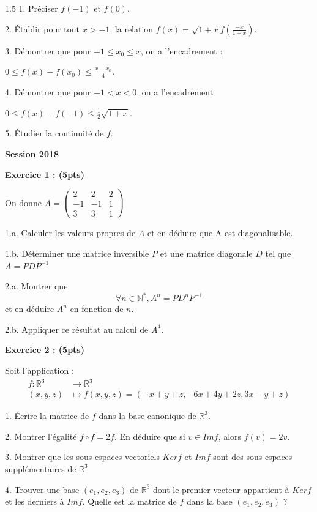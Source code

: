 \documentclass[12pt]{article}
\begin{document}
\begin{spacing}{1.5}
1. Préciser $f(-1)$ et $f(0)$.

2. Établir pour tout $x>-1$, la relation $f(x)=\sqrt{1+x}f(\frac{-x}{1+x})$.

3. Démontrer que pour $-1\leq x_0\leq x$, on a l'encadrement :

$0\leq f(x)-f(x_0)\leq \frac{x-x_0}{4}$.

4. Démontrer que pour $-1<x<0$, on a l'encadrement 

$0\leq f(x)-f(-1)\leq \frac{1}{2}\sqrt{1+x}$.

5. Étudier la continuité de $f$.



\medskip

\textbf{Session 2018}

\textbf{Exercice 1 : (5pts)}

On donne $A=\begin{pmatrix}
2 & 2& 2 \\ 
-1 & -1 & 1 \\ 
3 & 3 & 1
\end{pmatrix} $

1.a. Calculer les valeurs propres de $A$ et en déduire que A est diagonalisable.

1.b. Déterminer une matrice inversible $P$ et une matrice diagonale $D$ tel que $A=PDP^{-1}$

2.a. Montrer que 
\[
\forall {n\in\mathbb{N}^*}, A^n = PD^nP^{-1}
\]
et en déduire $A^n$ en fonction de $n$.

2.b. Appliquer ce résultat au  calcul de $A^4$.

\textbf{Exercice 2 : (5pts)}

Soit l'application : 
\begin{align*}
f:\mathbb{R}^3 &\longrightarrow \mathbb{R}^3\\
(x,y,z) &\longmapsto f(x,y,z)=(-x+y+z, -6x+4y+2z, 3x-y+z)
\end{align*} 

1. Écrire la matrice de $f$ dans la base canonique de $\mathbb{R}^3$.

2. Montrer l'égalité $f\circ f= 2f$. En déduire que si $v\in Imf$, alors $f(v)=2v$.

3. Montrer que les sous-espaces vectoriels $Kerf$ et $Imf$ sont des sous-espaces supplémentaires de $\mathbb{R}^3$

4. Trouver une base $(e_1,e_2,e_3)$ de $\mathbb{R}^3$ dont le premier vecteur appartient à $Kerf$ et les derniers à $Imf$. Quelle est la matrice de $f$ dans la base $(e_1,e_2,e_3)$ ?


\end{spacing}
\end{document}
